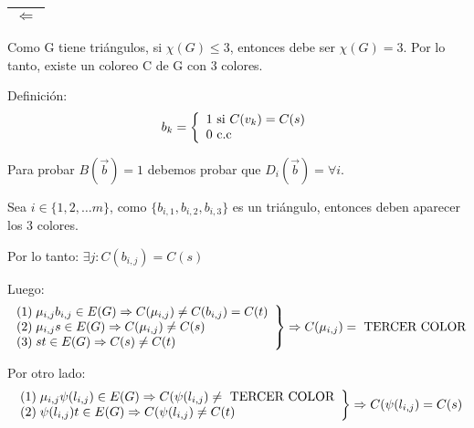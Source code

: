 \documentclass[12pt,a4paper]{report}
\newcounter{neq}
\begin{document}
		\vspace{5mm}
		\begin{tabular}{|c|} \hline $\Leftarrow$ \\ \hline \end{tabular}

			Como G tiene triángulos, si $\chi (G) \leq 3$, entonces debe ser $\chi (G) = 3$. Por lo tanto, existe un coloreo C de G con 3 colores.

			Definición:
			\begin{equation*}
				b_{k} =
  				\left \lbrace
  				\begin{array}{l}
    		 	1 \textup{ si } C(v_{k}) = C(s) \\
    		 	0 \textup{ c.c}
  				\end{array}
  				\right.
			\end{equation*}

		Para probar $B(\overrightarrow{b}) = 1$ debemos probar que $D_{i}(\overrightarrow{b}) = \forall i$.

		Sea $i \in \lbrace	1, 2, \dotsc m \rbrace$, como $ \lbrace b_{i, 1}, b_{i, 2}, b_{i, 3} \rbrace$ es un triángulo, entonces deben aparecer los 3 colores.
		\par 	Por lo tanto: $\exists j : C(b_{i, j}) = C(s)$
		\par Luego:
			\begin{equation*}
  			\left.
  			\begin{array}{l}
    		 	(1) \; \mu_{i, j} b_{i, j} \in E(G) \Rightarrow C(\mu_{i, j}) \neq C(b_{i, j}) = C(t) \\
    		 	(2) \; \mu_{i, j} s \in E(G) \Rightarrow C(\mu_{i, j}) \neq C(s) \\
    		 	(3) \; s t \in E(G) \Rightarrow C(s) \neq C(t)
  			\end{array}
 			 \right\rbrace
 			 \Rightarrow C(\mu_{i, j}) = \textup{ TERCER COLOR}
			\end{equation*}

		\par Por otro lado:
			\begin{equation*}
  			\left.
  			\begin{array}{l}
    		 	(1) \; \mu_{i, j} \psi(l_{i, j}) \in E(G) \Rightarrow C(\psi(l_{i, j}) \neq \textup{ TERCER COLOR} \\
    		 	(2) \; \psi(l_{i, j}) t \in E(G) \Rightarrow C(\psi(l_{i, j}) \neq C(t)
  			\end{array}
 			 \right\rbrace
 			 \Rightarrow C(\psi(l_{i, j}) = C(s)
			\end{equation*}
\end{document}
